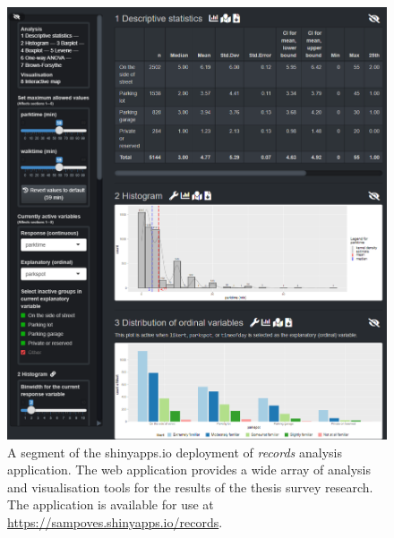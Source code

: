 \begin{figure}[H]%
    \centering
    \includegraphics[width=.75\textwidth]{images/shinyapps_analysis.png}
    \caption[Records analysis application screen capture]{A segment of the shinyapps.io deployment of \textit{records} analysis application. The web application provides a wide array of analysis and visualisation tools for the results of the thesis survey research. The application is available for use at \textcolor{blue}{\url{https://sampoves.shinyapps.io/records}}.}%
    \label{fig:shinyapps_analysis}%
\end{figure}

